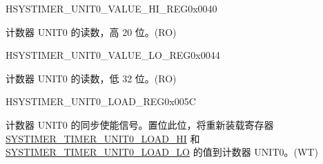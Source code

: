 \begin{register}{H}{SYSTIMER\_UNIT0\_VALUE\_HI\_REG}{0x0040}\label{regdesc:SYSTIMERUNIT0VALUEHIREG}
%
%
\regnewline%
\begin{regdesc}\begin{reglist}
\label{fielddesc:SYSTIMERTIMERUNIT0VALUEHI}\item [SYSTIMER\_TIMER\_UNIT0\_VALUE\_HI] 计数器 UNIT0 的读数，高 20 位。(RO)
\end{reglist}\end{regdesc}
\end{register}


\begin{register}{H}{SYSTIMER\_UNIT0\_VALUE\_LO\_REG}{0x0044}\label{regdesc:SYSTIMERUNIT0VALUELOREG}
%
\regnewline%
\begin{regdesc}\begin{reglist}
\label{fielddesc:SYSTIMERTIMERUNIT0VALUELO}\item [SYSTIMER\_TIMER\_UNIT0\_VALUE\_LO] 计数器 UNIT0 的读数，低 32 位。(RO)
\end{reglist}\end{regdesc}
\end{register}


\begin{register}{H}{SYSTIMER\_UNIT0\_LOAD\_REG}{0x005C}\label{regdesc:SYSTIMERUNIT0LOADREG}
%
%
\regnewline%
\begin{regdesc}\begin{reglist}
\label{fielddesc:SYSTIMERTIMERUNIT0LOAD}\item [SYSTIMER\_TIMER\_UNIT0\_LOAD] 计数器 UNIT0 的同步使能信号。置位此位，将重新装载寄存器 \hyperref[fielddesc:SYSTIMERTIMERUNIT0LOADHI]{SYSTIMER\_TIMER\_UNIT0\_LOAD\_HI} 和 \hyperref[fielddesc:SYSTIMERTIMERUNIT0LOADLO]{SYSTIMER\_TIMER\_UNIT0\_LOAD\_LO} 的值到计数器 UNIT0。(WT)
\end{reglist}\end{regdesc}
\end{register}


